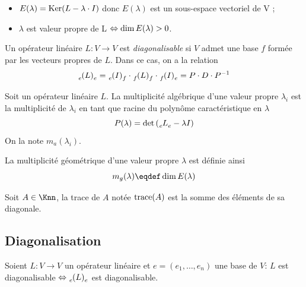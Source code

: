 \begin{myrem}
	\InsertTheoremBreak
	\begin{itemize}
		\item $E(\lambda) = \operatorname{Ker} (L - \lambda \cdot I)$ donc $E(\lambda)$ est un sous-espace vectoriel de V ;
		\item $\lambda$ est valeur propre de L $\Leftrightarrow \operatorname{dim} E(\lambda) > 0$.
	\end{itemize}
\end{myrem}

\begin{mydef}
	Un opérateur linéaire $L: V \to V$ est \emph{diagonalisable} si $V$ admet une base $f$ formée par les vecteurs propres de $L$. Dans ce cas, on a la relation
	\[ \tensor*[_e]{(L)}{_e}
	= \tensor*[_e]{(I)}{_f} \cdot \tensor*[_f]{(L)}{_f} \cdot \tensor*[_f]{(I)}{_e}
	= P \cdot D \cdot P^{-1} \]
\end{mydef}

\begin{mydef}
	Soit un opérateur linéaire $L$.
	La multiplicité algébrique d'une valeur propre $\lambda_i$ est la multiplicité de $\lambda_i$ en tant que racine du polynôme caractéristique en $\lambda$
	\[ P(\lambda) = \det \left( \tensor*[_e]{L}{_e} - \lambda I \right) \]
	On la note $m_a(\lambda_i)$.
\end{mydef}

\begin{mydef}
	La multiplicité géométrique d'une valeur propre $\lambda$ est définie ainsi
	\[ m_g(\lambda) \eqdef \newdim E(\lambda) \]
\end{mydef}

\begin{mydef}
	Soit $A \in \Knn$,
	la trace de $A$ notée $\operatorname{trace}(A)$ est la somme des éléments de sa diagonale.
\end{mydef}

\subsection{Diagonalisation}

\begin{myprop}
	Soient $L : V \to V$ un opérateur linéaire et $e = (e_1, \dots, e_n)$ une base de $V$:
	$L$ est diagonalisable $\Leftrightarrow \tensor[_e]{(L)}{_e}$ est diagonalisable.
\end{myprop}

